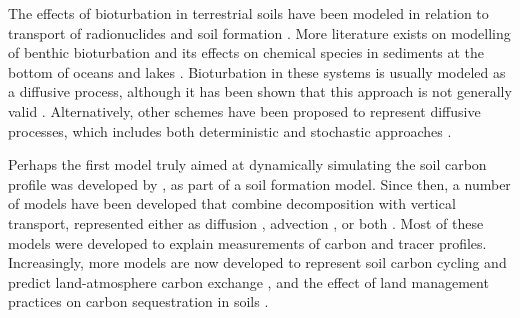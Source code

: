 \documentclass[11pt, oneside, a4paper]{article}   	%
\begin{document}
The effects of bioturbation in terrestrial soils have been modeled in relation to
transport of radionuclides \citep[e.g.][]{Muller1996, Kaste2007, Bunzl2002} and soil formation \citep{Kirkby1977, Salvador2007}.
More literature exists on modelling of benthic bioturbation and its effects on chemical species in sediments at the bottom of oceans and lakes \citep[e.g.][]{Boudreau1986b, Meysman2005, Meysman2010, Sarmiento2006, Arndt2013}. Bioturbation in these systems is usually modeled as a diffusive process, although it has been shown that this approach is not generally valid \citep{Meysman2003, Meysman2010}. Alternatively, other schemes have been proposed to represent diffusive processes, which includes both deterministic \citep{Boudreau1986a, Boudreau1989} and stochastic approaches \citep{Bunzl2002, Choi2002, Meysman2008}.

Perhaps the first model truly aimed at dynamically simulating the soil carbon profile
was developed by \citet{Kirkby1977}, as part of a soil formation model. Since then, a
number of models have been developed that combine decomposition with vertical
transport, represented either as diffusion \citep{OBrien1978, vanDam1997, Koven2009}, advection \citep{Nakane1978, Dorr1989, Bosatta1996, Feng1999, Baisden2002, Jenkinson2008}, or both \citep{Elzein1995, Bruun2007, Freier2010, Guenet2013, Koven2013BGS, Braakhekke2011, Braakhekke2013}. Most of these models were developed to
explain measurements of carbon and tracer profiles. Increasingly, more models are now developed to represent soil carbon cycling and predict land-atmosphere carbon exchange \citep{Huang2018, Koven2013BGS, Tifafi2018, Ahrens2020, Luo2020, Wang2021}, and the effect of land management practices on carbon sequestration in soils \citep{Jenkinson2008, Taghizadeh2014, Keyvanshokouhi2019, Mary2020}.
\end{document}
